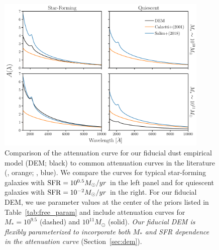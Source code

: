\begin{figure}
\begin{center}
    \includegraphics[width=0.9\textwidth]{figs/dems.pdf}
    \caption{Comparison of the attenuation curve for our fiducial dust empirical
    model (DEM; black) to common attenuation curves in the
    literature (\citealt{calzetti2001}, orange; \citealt{salim2018}, blue). We compare the curves for typical 
    star-forming galaxies with ${\rm SFR}=10^{0.5}M_\odot/yr$ in the left panel
    and for quiescent galaxies with ${\rm SFR}=10^{-2}M_\odot/yr$ in the right.
    For our fiducial DEM, we use parameter values at {\color{red} the center of the priors
    listed in Table~\ref{tab:free_param}} and include attenuation curves for $M_* = 10^{9.5}$
    (dashed) and $10^{11} M_\odot$ (solid). {\em Our fiducial DEM is flexibly
    parameterized to incorporate both $M_*$ and SFR dependence in the
    attenuation curve} (Section~\ref{sec:dem}).
    } 
\label{fig:dem}
\end{center}
\end{figure}


